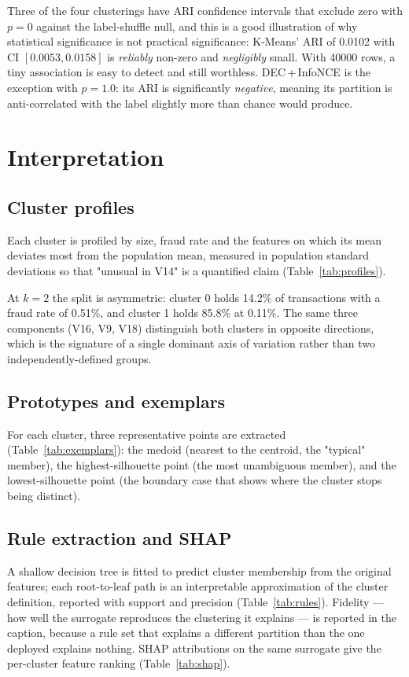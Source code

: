 \documentclass[11pt, a4paper]{article}
\providecommand{\num}[1]{#1}
\begin{document}


Three of the four clusterings have ARI confidence intervals that exclude zero
with $p = 0$ against the label-shuffle null, and this is a good illustration of
why statistical significance is not practical significance: K-Means' ARI of
\num{0.0102} with CI $[0.0053, 0.0158]$ is \emph{reliably} non-zero and
\emph{negligibly} small. With \num{40000} rows, a tiny association is easy to
detect and still worthless. DEC\,+\,InfoNCE is the exception with $p = 1.0$: its
ARI is significantly \emph{negative}, meaning its partition is anti-correlated
with the label slightly more than chance would produce.

\section{Interpretation}

\subsection{Cluster profiles}
Each cluster is profiled by size, fraud rate and the features on which its mean
deviates most from the population mean, measured in population standard
deviations so that "unusual in V14" is a quantified claim
(Table~\ref{tab:profiles}).



At $k=2$ the split is asymmetric: cluster 0 holds \num{14.2}\% of transactions
with a fraud rate of \num{0.51}\%, and cluster 1 holds \num{85.8}\% at
\num{0.11}\%. The same three components (V16, V9, V18) distinguish both clusters
in opposite directions, which is the signature of a single dominant axis of
variation rather than two independently-defined groups.

\subsection{Prototypes and exemplars}
For each cluster, three representative points are extracted
(Table~\ref{tab:exemplars}): the medoid (nearest to the centroid, the
"typical" member), the highest-silhouette point (the most unambiguous member),
and the lowest-silhouette point (the boundary case that shows where the cluster
stops being distinct).



\subsection{Rule extraction and SHAP}
A shallow decision tree is fitted to predict cluster membership from the original
features; each root-to-leaf path is an interpretable approximation of the cluster
definition, reported with support and precision
(Table~\ref{tab:rules}). Fidelity --- how well the surrogate reproduces the
clustering it explains --- is reported in the caption, because a rule set that
explains a different partition than the one deployed explains nothing. SHAP
attributions on the same surrogate give the per-cluster feature ranking
(Table~\ref{tab:shap}).
\end{document}
